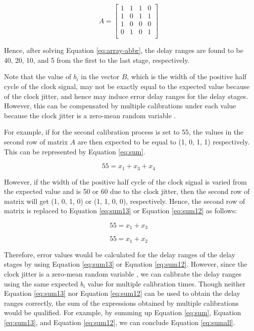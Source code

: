 \begin{equation}
    A=\left[
        \begin{array}
            {cccc}
            1 & 1 & 1 & 0 \\
            1 & 0 & 1 & 1 \\
            1 & 0 & 0 & 0 \\
            0 & 1 & 0 & 1 \\
        \end{array}
        \right]
\end{equation}

Hence, after solving Equation \ref{eq:array-abbr}, the delay ranges are found to be 40, 20, 10, and 5 from the first to the last stage, respectively.

Note that the value of $b_{i}$ in the vector $B$, which is the width of the positive half cycle of the clock signal, may not be exactly equal to the expected value because of the clock jitter, and hence may induce error delay ranges for the delay stages. However, this can be compensated by multiple calibrations under each value because the clock jitter is a zero-mean random variable \cite{jan2003digital}. 

For example, if for the second calibration process is set to 55, the values in the second row of matrix $A$ are then expected to be equal to (1, 0, 1, 1) respectively. This can be represented by Equation \ref{eq:sum}.

\begin{equation} \label{eq:sum}
    55 = x_{1} + x_{3} + x_{4}
\end{equation}

However, if the width of the positive half cycle of the clock signal is varied from the expected value and is 50 or 60 due to the clock jitter, then the second row of matrix will get (1, 0, 1, 0) or (1, 1, 0, 0), respectively. Hence, the second row of matrix is replaced to Equation \ref{eq:sum13} or Equation \ref{eq:sum12} as follows:

\begin{equation} \label{eq:sum13}
    55 = x_{1} + x_{3}
\end{equation}

\begin{equation} \label{eq:sum12}
    55 = x_{1} + x_{2}
\end{equation}


Therefore, error values would be calculated for the delay ranges of the delay stages by using Equation \ref{eq:sum13} or Equation \ref{eq:sum12}. However, since the clock jitter is a zero-mean random variable \cite{jan2003digital}, we can calibrate the delay ranges using the same expected $b_{i}$ value for multiple calibration times. Though neither Equation \ref{eq:sum13} nor Equation \ref{eq:sum12} can be used to obtain the delay ranges correctly, the sum of the expressions obtained by multiple calibrations would be qualified. For example, by summing up Equation \ref{eq:sum}, Equation \ref{eq:sum13}, and Equation \ref{eq:sum12}, we can conclude Equation \ref{eq:sumall}.

